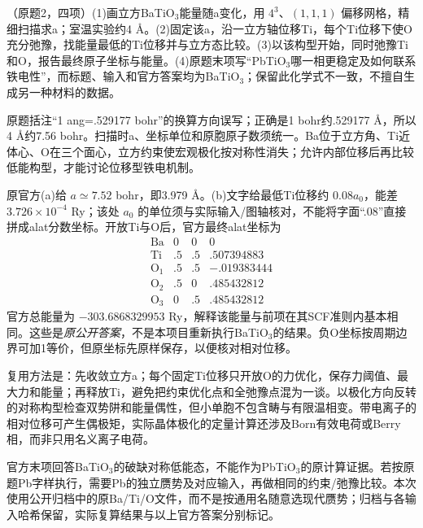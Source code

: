 \begin{exercise}\label{task:lab3-2}
（原题2，四项）(1)画立方BaTiO$_3$能量随a变化，用 $4^3$、$(1,1,1)$ 偏移网格，精细扫描求a；室温实验约4 \AA{}。(2)固定该a，沿一立方轴位移Ti，每个Ti位移下使O充分弛豫，找能量最低的Ti位移并与立方态比较。(3)以该构型开始，同时弛豫Ti和O，报告最终原子坐标与能量。(4)原题末项写“PbTiO$_3$哪一相更稳定及如何联系铁电性”，而标题、输入和官方答案均为BaTiO$_3$；保留此化学式不一致，不擅自生成另一种材料的数据。
\end{exercise}
\begin{solution}
原题括注“1 ang=.529177 bohr”的换算方向误写；正确是1 bohr约.529177 \AA{}，所以4 \AA{}约7.56 bohr。扫描时a、坐标单位和原胞原子数须统一。Ba位于立方角、Ti近体心、O在三个面心，立方约束使宏观极化按对称性消失；允许内部位移后再比较低能构型，才能讨论位移型铁电机制。

原官方(a)给 $a\simeq7.52$ bohr，即3.979 \AA{}。(b)文字给最低Ti位移约 $0.08a_0$，能差 $3.726\times10^{-4}$ Ry；该处 $a_0$ 的单位须与实际输入/图轴核对，不能将字面“.08”直接拼成alat分数坐标。开放Ti与O后，官方最终alat坐标为
\[
\begin{array}{c|rrr}
\mathrm{Ba}&0&0&0\\
\mathrm{Ti}&.5&.5&.507394883\\
\mathrm{O}_1&.5&.5&-.019383444\\
\mathrm{O}_2&.5&0&.485432812\\
\mathrm{O}_3&0&.5&.485432812
\end{array}
\]
官方总能量为 $-303.6868329953$ Ry，解释该能量与前项在其SCF准则内基本相同。这些是\emph{原公开答案}，不是本项目重新执行BaTiO$_3$的结果。负O坐标按周期边界可加1等价，但原坐标先原样保存，以便核对相对位移。

复用方法是：先收敛立方a；每个固定Ti位移只开放O的力优化，保存力阈值、最大力和能量；再释放Ti，避免把约束优化点和全弛豫点混为一谈。以极化方向反转的对称构型检查双势阱和能量偶性，但小单胞不包含畴与有限温相变。带电离子的相对位移可产生偶极矩，实际晶体极化的定量计算还涉及Born有效电荷或Berry相，而非只用名义离子电荷。

官方末项回答BaTiO$_3$的破缺对称低能态，不能作为PbTiO$_3$的原计算证据。若按原题Pb字样执行，需要Pb的独立赝势及对应输入，再做相同的约束/弛豫比较。本次使用公开归档中的原Ba/Ti/O文件，而不是按通用名随意选现代赝势；归档与各输入哈希保留，实际复算结果与以上官方答案分别标记。
\end{solution}

